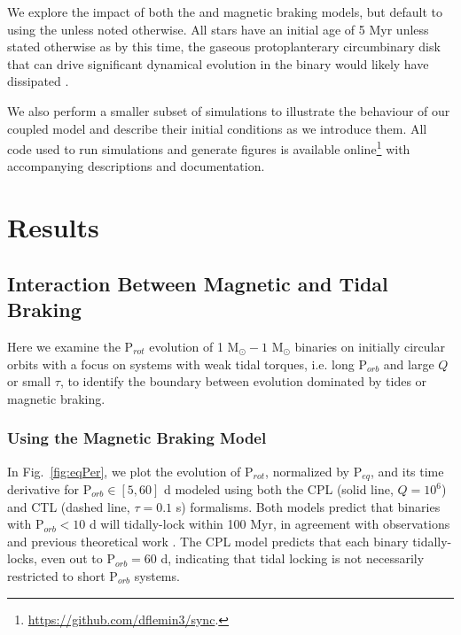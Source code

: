 \documentclass[twocolumn]{aastex61}
\begin{document}
We explore the impact of both the \citet{Matt2015} and \citet{Reiners2012} magnetic braking models, but default to using the \citet{Matt2015} unless noted otherwise. All stars have an initial age of 5 Myr unless stated otherwise as by this time, the gaseous protoplanterary circumbinary disk that can drive significant dynamical evolution in the binary \citep[e.g.][]{Fleming2017} would likely have dissipated \citep{Haisch2001}.

We also perform a smaller subset of simulations to illustrate the behaviour of our coupled model and describe their initial conditions as we introduce them. All code used to run simulations and generate figures is available online\footnote{\href{https://github.com/dflemin3/sync}{https://github.com/dflemin3/sync}.} with accompanying descriptions and documentation.


\section{Results} \label{sec:results}

\subsection{Interaction Between Magnetic and Tidal Braking} \label{sec:eq}

Here we examine the P$_{rot}$ evolution of 1 M$_{\odot} - 1$ M$_{\odot}$ binaries on initially circular orbits with a focus on systems with weak tidal torques, i.e. long P$_{orb}$ and large $Q$ or small $\tau$, to identify the boundary between evolution dominated by tides or magnetic braking.  

\subsubsection{Using the \citet{Matt2015} Magnetic Braking Model}

In Fig.~\ref{fig:eqPer}, we plot the evolution of P$_{rot}$, normalized by P$_{eq}$, and its time derivative for P$_{orb} \in [5,60]$ d modeled using both the CPL (solid line, $Q=10^6$) and CTL (dashed line, $\tau = 0.1$ s) formalisms. Both models predict that binaries with P$_{orb} < 10$ d will tidally-lock within 100 Myr, in agreement with observations \citep{Meibom2005} and previous theoretical work \citep{Zahn1989}. The CPL model predicts that each binary tidally-locks, even out to P$_{orb} = 60$ d, indicating that tidal locking is not necessarily restricted to short P$_{orb}$ systems. 
\end{document}
